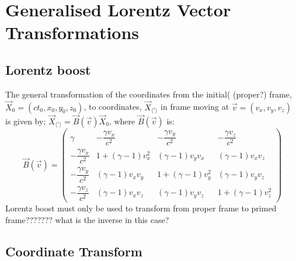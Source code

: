 \chapter{Generalised Lorentz Vector Transformations}

\section{Lorentz boost}
The general transformation of the coordinates from the initial( (proper?) frame, $\vec{X}_0 = (ct_0,x_0,y_0,z_0)$, to coordinates, $\vec{X}_{\langle ' \rangle} $ in frame moving at $\vec{v}=(v_x,v_y,v_z)$ is given by; $\vec{X}_{\langle ' \rangle} = \vec{B}(\vec{v})\vec{X}_0$, where $\vec{B}(\vec{v})$ is:
\begin{equation}%
    \vec{B}(\vec{v}) = \begin{pmatrix}
    \gamma & -\dfrac{\gamma v_x}{c^2}& -\dfrac{\gamma v_y}{c^2}&- \dfrac{\gamma v_z}{c^2} \\
    -\dfrac{\gamma v_x}{c^2} & 1+(\gamma-1)v^{2}_{x} & (\gamma-1)v_yv_x& (\gamma-1)v_xv_z \\
    -\dfrac{\gamma v_y}{c^2} & (\gamma-1)v_xv_y & 1+ (\gamma-1)v^{2}_{y}& (\gamma-1)v_yv_z \\
    -\dfrac{\gamma v_z}{c^2} & (\gamma-1)v_xv_z & (\gamma-1)v_yv_z & 1+(\gamma-1)v^{2}_{z}
    \end{pmatrix}
\end{equation}%
Lorentz boost must only be used to transform from proper frame to primed frame??????? what is the inverse in this case?

\section{Coordinate Transform}

